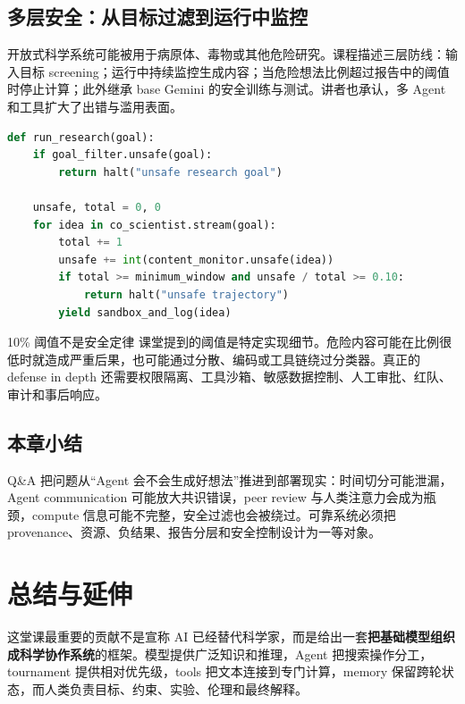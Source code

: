 \documentclass[a4paper]{article}
\begin{document}
\subsection{多层安全：从目标过滤到运行中监控}

开放式科学系统可能被用于病原体、毒物或其他危险研究。课程描述三层防线：输入目标 screening；运行中持续监控生成内容；当危险想法比例超过报告中的阈值时停止计算；此外继承 base Gemini 的安全训练与测试。讲者也承认，多 Agent 和工具扩大了出错与滥用表面。

\begin{lstlisting}[language=Python,caption={课堂所述多层安全监控的概念化版本}]
def run_research(goal):
    if goal_filter.unsafe(goal):
        return halt("unsafe research goal")

    unsafe, total = 0, 0
    for idea in co_scientist.stream(goal):
        total += 1
        unsafe += int(content_monitor.unsafe(idea))
        if total >= minimum_window and unsafe / total >= 0.10:
            return halt("unsafe trajectory")
        yield sandbox_and_log(idea)
\end{lstlisting}

\begin{warningbox}{10\% 阈值不是安全定律}
课堂提到的阈值是特定实现细节。危险内容可能在比例很低时就造成严重后果，也可能通过分散、编码或工具链绕过分类器。真正的 defense in depth 还需要权限隔离、工具沙箱、敏感数据控制、人工审批、红队、审计和事后响应。
\end{warningbox}


\subsection{本章小结}

Q\&A 把问题从“Agent 会不会生成好想法”推进到部署现实：时间切分可能泄漏，Agent communication 可能放大共识错误，peer review 与人类注意力会成为瓶颈，compute 信息可能不完整，安全过滤也会被绕过。可靠系统必须把 provenance、资源、负结果、报告分层和安全控制设计为一等对象。

\section{总结与延伸}

这堂课最重要的贡献不是宣称 AI 已经替代科学家，而是给出一套\textbf{把基础模型组织成科学协作系统}的框架。模型提供广泛知识和推理，Agent 把搜索操作分工，tournament 提供相对优先级，tools 把文本连接到专门计算，memory 保留跨轮状态，而人类负责目标、约束、实验、伦理和最终解释。
\end{document}
